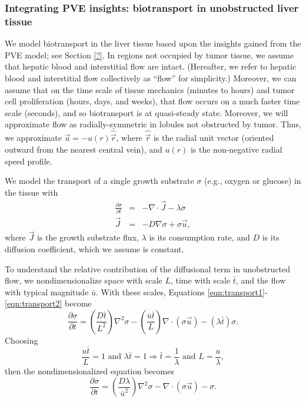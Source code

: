 \documentclass[smallextended,natbib,draft]{svjour3}
\newcommand{\beqa}{\begin{eqnarray}}
\newcommand{\beq}{\begin{equation}}
\newcommand{\eeqa}{\end{eqnarray}}
\newcommand{\eeq}{\end{equation}}
\newcommand{\hatvec}[1]{\hat{\vec{#1}}}
\begin{document}
\subsubsection{Integrating PVE insights: biotransport in unobstructed liver tissue}
\label{sec:idealized_lobular_biotransport}
We model biotransport in the liver tissue based upon the 
insights gained from the PVE model; see Section \ref{?}. In 
regions not occupied by tumor tissue, we assume that hepatic blood 
and interstitial flow are intact. (Hereafter, we 
refer to hepatic blood and interstitial flow collectively 
as ``flow'' for simplicity.) Moreover, we can assume that 
on the time scale of tissue mechanics (minutes to hours) and 
tumor cell proliferation (hours, days, and weeks), that flow occurs 
on a much faster time scale (seconds), and so biotransport is at quasi-steady 
state. Moreover, we will approximate flow as radially-symmetric in lobules not 
obstructed by tumor. Thus, we approximate $\vec{u} = - u(r) \hatvec{r}$, 
where $\hatvec{r}$ is the radial unit vector (oriented outward from the nearest
central vein), and $u(r)$ is the non-negative radial speed profile. 

We model the transport of a single growth substrate $\sigma$ 
(e.g., oxygen or glucose) in the tissue with 
\beqa
\frac{ \partial \sigma }{\partial t} & = & 
-\nabla \cdot \vec{J} - \lambda \sigma \label{eqn:transport1}  \\
\vec{J} &  = & -D \nabla \sigma + \sigma \vec{u} \label{eqn:transport2} , 
\eeqa
where $\vec{J}$ is the growth substrate flux, $\lambda$ is its 
consumption rate, and $D$ is its diffusion coefficient, which 
we assume is constant. 

To understand the relative contribution of the diffusional 
term in unobstructed flow, we nondimensionalize space with scale $L$, time 
with scale $\bar{t}$, and the flow with typical magnitude  
$\bar{u}$. With these scales, 
Equations \ref{eqn:transport1}-\ref{eqn:transport2} 
become 
\beq
\frac{ \partial  \sigma}{\partial t}  =  
\left( \frac{ D \bar t}{ L^2 } \right) \nabla^2 \sigma  
- \left(  \frac{\bar{u} \bar{t} }{L} \right)
\nabla \cdot \left( \sigma \vec{u} \right) 
 - \left( \lambda \bar{t} \right) \sigma. 
\eeq
Choosing 
\beq
\frac{ u \bar{t}}{L } = 1 \textrm{ and } \lambda \bar{t} = 1 
\Longrightarrow \bar{t} = \frac{1}{\lambda} \textrm{ and } 
L = \frac{ u }{ \lambda }, 
\eeq
then the nondimensionalized equation becomes 
\beq
\frac{ \partial  \sigma}{\partial t}  =  
\left( \frac{ D \lambda }{ \bar{u}^2 } \right) \nabla^2 \sigma  
- \nabla \cdot \left( \sigma \vec{u} \right) - \sigma . 
\eeq
\end{document}
